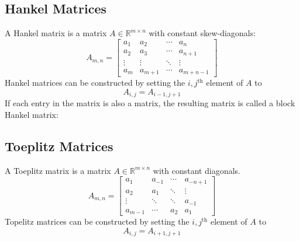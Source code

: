 \subsection{Hankel Matrices}
A Hankel matrix is a matrix $A \in \mathbb{R}^{m\times n}$ with constant skew-diagonals:
\begin{equation*}
A_{m,n} = \begin{bmatrix}
a_1 & a_2 & \cdots & a_n\\
a_2 & a_3 & \cdots & a_{n+1}\\
\vdots & \vdots & \ddots & \vdots\\
a_m & a_{m+1} & \cdots & a_{m+n-1}
\end{bmatrix}
\end{equation*}
Hankel matrices can be constructed by setting the $i,j^{\mbox{th}}$ element of $A$ to
\begin{equation*}
A_{i,j} = A_{i-1, j+1}
\end{equation*}
If each entry in the matrix is also a matrix, the resulting matrix is called a block Hankel matrix:


\subsection{Toeplitz Matrices}
A Toeplitz matrix is a matrix $A\in\mathbb{R}^{m\times n}$ with constant diagonals. 
\begin{equation*}
A_{m,n} = \begin{bmatrix}
a_1 & a_{-1} & \cdots & a_{-n+1}\\
a_2 & a_1 & \ddots & \vdots\\
\vdots & \ddots & \ddots & a_{-1}\\
a_{m-1} & \cdots & a_2 & a_1
\end{bmatrix}
\end{equation*}
Topelitz matrices can be constructed by setting the $i,j^{\mbox{th}}$ element of $A$ to
\begin{equation*}
A_{i,j} = A_{i+1, j+1}
\end{equation*}
